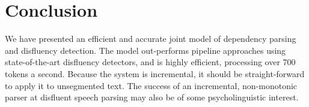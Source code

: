 \documentclass[11pt,letterpaper]{article}
\begin{document}
\section{Conclusion}

We have presented an efficient and accurate joint model of dependency parsing and
disfluency detection.  The model out-performs pipeline approaches using state-of-the-art
disfluency detectors, and is highly efficient, processing over 700 tokens a second.
Because the system is incremental, it should be straight-forward to apply it
to unsegmented text. The success of an incremental, non-monotonic parser at
disfluent speech parsing may also be of some psycholinguistic interest.



\end{document}
